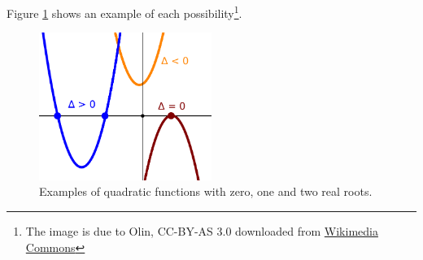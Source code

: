 \documentclass[12pt,a4paper]{article}
\newcommand{\nextalt}[1]{}
\theoremstyle{clearprint}
\begin{document}
Figure \ref{DisFig} shows an example of each possibility\footnote{The image is due to Olin, CC-BY-AS 3.0 downloaded from \href{https://commons.wikimedia.org/wiki/File:Quadratic_eq_discriminant.svg}{Wikimedia Commons}}.
\begin{figure}[!h]
\begin{center}
\nextalt{Horizontal and vertical axes without scale with three separate quadratic graphs are shown. The left most quadratic opens upwards, crosses the horizontal axis twice, is labelled capital delta greater than 0 and is drawn in blue. The central quadratic opens upwards, does not cross the horizontal axis, is labelled capital delta less than 0 and is drawn in yellow. The right most quadratic opens downwards, touches the horizontal axis at a single point, is labelled capital delta equals 0 and is drawn in red. 
}
\includegraphics[width=0.5\textwidth]{Quadratic_eq_discriminant.pdf}
\end{center}
\caption{Examples of quadratic functions with zero, one and two real roots.}
\label{DisFig}
\end{figure}
\end{document}
